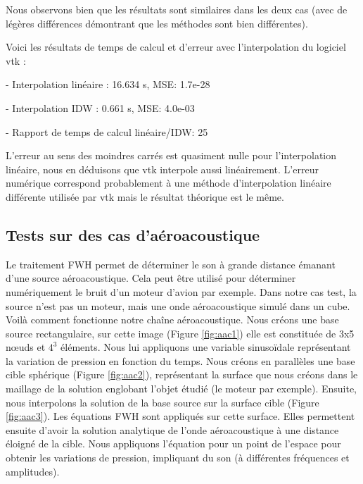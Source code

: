 Nous observons bien que les résultats sont similaires dans les deux cas (avec de légères différences démontrant que les méthodes sont bien différentes).

Voici les résultats de temps de calcul et d'erreur avec l'interpolation du logiciel vtk :

- Interpolation linéaire :         16.634 s, MSE: 1.7e-28

- Interpolation IDW :\hspace{0,4cm} 0.661 s, MSE: 4.0e-03

- Rapport de temps de calcul linéaire/IDW: 25

L'erreur au sens des moindres carrés est quasiment nulle pour l'interpolation linéaire, nous en déduisons que vtk interpole aussi linéairement. L'erreur numérique correspond probablement à une méthode d'interpolation linéaire différente utilisée par vtk mais le résultat théorique est le même.

\subsection{Tests sur des cas d'aéroacoustique}

Le traitement FWH permet de déterminer le son à grande distance émanant d'une source aéroacoustique. Cela peut être utilisé pour déterminer numériquement le bruit d'un moteur d'avion par exemple.
Dans notre cas test, la source n'est pas un moteur, mais une onde aéroacoustique simulé dans un cube.
Voilà comment fonctionne notre chaîne aéroacoustique.\label{s243}
Nous créons une base source rectangulaire, sur cette image (Figure \ref{fig:aac1}) elle est constituée de 3x5 nœuds et $4^3$ éléments.
Nous lui appliquons une variable sinusoïdale représentant la variation de pression en fonction du temps.
Nous créons en parallèles une base cible sphérique (Figure \ref{fig:aac2}), représentant la surface que nous créons dans le maillage de la solution englobant l'objet étudié (le moteur par exemple).
Ensuite, nous interpolons la solution de la base source sur la surface cible (Figure \ref{fig:aac3}).
Les équations FWH sont appliqués sur cette surface. Elles permettent ensuite d'avoir la solution analytique de l'onde aéroacoustique à une distance éloigné de la cible. Nous appliquons l'équation pour un point de l'espace pour obtenir les variations de pression, impliquant du son (à différentes fréquences et amplitudes).

